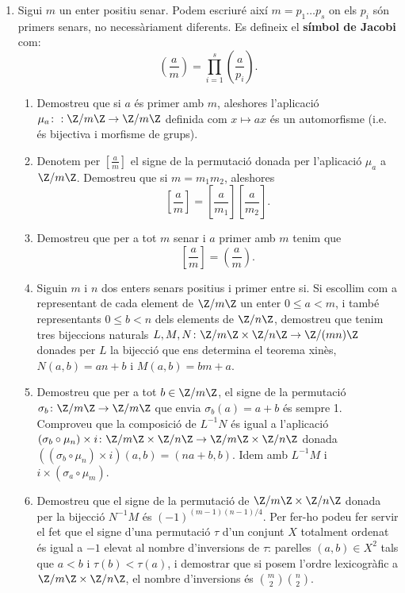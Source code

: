 \begin{enumerate}[leftmargin=*]
\item Sigui $m$ un enter positiu
senar. Podem escriuré així $m=p_1\dots p_s$ on els $p_i$ són primers
senars, no necessàriament diferents. Es defineix el \textbf{símbol de Jacobi}
com:
$$
\displaystyle{\left (\frac{a}{m} \right )=\prod_{i=1}^{s}\left
(\frac{a}{p_i} \right )}.
$$

\begin{enumerate}
\item Demostreu que si $a$ és primer amb $m$, aleshores
l'aplicació $\mu_a\colon : \Z/m\Z\to \Z/m\Z$ definida com $x\mapsto ax$ és un automorfisme
(i.e. és bijectiva i morfisme de grups).

\item Denotem per  $\displaystyle{\left[\frac{a}{m} \right]}$ el signe de la permutació donada per
l'aplicació $\mu_a$ a $\Z/m\Z$. Demostreu que si $m=m_1m_2$,
aleshores
$$
\displaystyle{\left[ \frac{a}{m} \right] =\left [\frac{a}{m_1}
\right]\left [\frac{a}{m_2} \right]}.
$$

\item Demostreu que per a tot $m$ senar i $a$ primer amb $m$
tenim que
$$\displaystyle{\left[\frac{a}{m} \right]}=\displaystyle{\left(\frac{a}{m}
\right)}.$$

\item Siguin $m$ i $n$ dos enters senars positius i primer
entre si. Si escollim com a representant de cada element de $\Z/m\Z$
un enter $0\le a <m$, i també representants $0\le b<n$ dels
elements de $\Z/n\Z$, demostreu que tenim tres bijeccions naturals
$L,M,N\colon \Z/m\Z\times \Z/n\Z\to \Z/(mn)\Z$ donades per $L$ la
bijecció que ens determina el teorema xin\`{e}s, $N(a,b)=an+b$ i
$M(a,b)=bm+a$.

\item Demostreu que per a tot $b\in \Z/m\Z$, el signe de la permutació
$\sigma_b\colon\Z/m\Z\to \Z/m\Z$ que envia $\sigma_b(a)=a+b$ és
sempre 1.  Comproveu que la composició de $L^{-1}N$ és igual
a l'aplicació $(\sigma_b\circ \mu_n)\times i \colon\Z/m\Z\times
\Z/n\Z\to \Z/m\Z\times \Z/n\Z$ donada $((\sigma_b\circ \mu_n)\times
i)(a,b)=(na+b,b)$. Idem amb $L^{-1}M$ i $i\times (\sigma_a\circ
\mu_m)$.

\item Demostreu que el signe de la permutació de $\Z/m\Z\times \Z/n\Z$ donada per la
bijecció $N^{-1}M$ és $(-1)^{(m-1)(n-1)/4}$. Per fer-ho podeu
fer servir el fet que el signe d'una permutació $\tau$ d'un conjunt $X$
totalment ordenat és igual a $-1$ elevat al nombre d'inversions de
$\tau$: parelles $(a,b)\in X^2$ tals que $a<b$ i $\tau(b)<\tau(a)$,
i demostrar que si posem l'ordre lexicogràfic a $\Z/m\Z\times
\Z/n\Z$, el nombre d'inversions és $ \binom{m}{2}\binom{n}{2}$.


\end{enumerate}
\end{enumerate}

